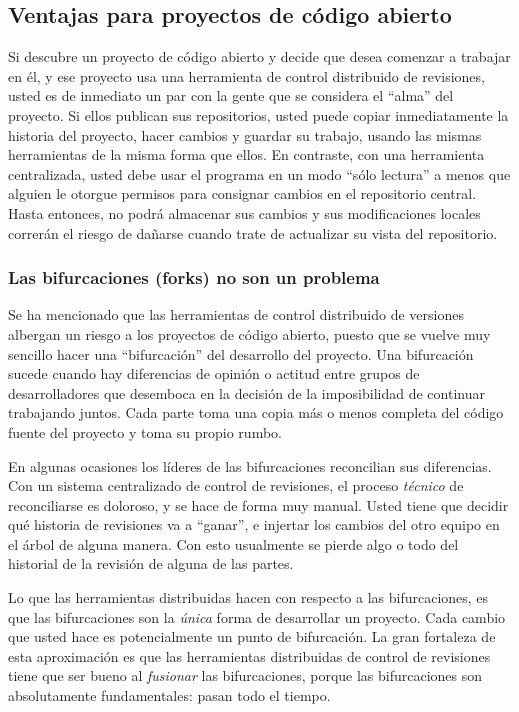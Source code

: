 \subsection{Ventajas para proyectos de código abierto}

Si descubre un proyecto de código abierto y decide que desea comenzar
a trabajar en él, y ese proyecto usa una herramienta de control
distribuido de revisiones, usted es de inmediato un par con la gente que se
considera el ``alma'' del proyecto.  Si ellos publican sus
repositorios, usted puede copiar inmediatamente la historia del proyecto,
hacer cambios y guardar su trabajo, usando las mismas herramientas de
la misma forma que ellos. En contraste, con una herramienta
centralizada, usted debe usar el programa en un modo ``sólo lectura'' a
menos que alguien le otorgue permisos para consignar cambios en el
repositorio central. Hasta entonces, no podrá almacenar sus cambios y
sus modificaciones locales correrán el riesgo de dañarse cuando trate
de actualizar su vista del repositorio.

\subsubsection{Las bifurcaciones (forks) no son un problema}

Se ha mencionado que las herramientas de control distribuido de
versiones albergan un riesgo a los proyectos de código abierto, puesto
que se vuelve muy sencillo hacer una ``bifurcación'' del
desarrollo del proyecto.  Una bifurcación sucede cuando hay diferencias
de opinión o actitud entre grupos de desarrolladores que desemboca en
la decisión de la imposibilidad de continuar trabajando juntos. Cada
parte toma una copia más o menos completa del código fuente del
proyecto y toma su propio rumbo.

En algunas ocasiones los líderes de las bifurcaciones reconcilian sus
diferencias. Con un sistema centralizado de control de revisiones, el
proceso \emph{técnico} de reconciliarse es doloroso, y se hace de
forma muy manual.  Usted tiene que decidir qué historia de revisiones va a
``ganar'', e injertar los cambios del otro equipo en el árbol de alguna
manera. Con esto usualmente se pierde algo o todo del historial de la
revisión de alguna de las partes.

Lo que las herramientas distribuidas hacen con respecto a las
bifurcaciones, es que las bifurcaciones son la \emph{única} forma de
desarrollar un proyecto. Cada cambio que usted hace es potencialmente
un punto de bifurcación. La gran fortaleza de esta aproximación es que
las herramientas distribuidas de control de revisiones tiene que ser
bueno al \emph{fusionar} las bifurcaciones, porque las bifurcaciones
son absolutamente fundamentales: pasan todo el tiempo.

